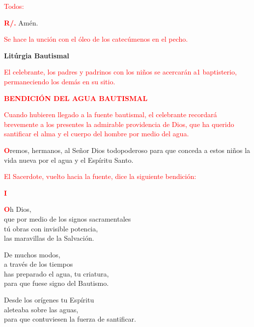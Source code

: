 \documentclass[12pt, letterpaper]{report}
\begin{document}
\large {\textcolor{red}{Todos:}}

\Large {\bfseries \textcolor{red}{R/.}} \hspace{0.5cm} Am\'en.

\large {\textcolor{red}{Se hace la unci\'on con el \'oleo de los catec\'umenos en el pecho.}}

\newpage

\begin{center}
\Huge {\bfseries Lit\'urgia Bautismal}
\end{center}

\large {\textcolor{red}{El celebrante, los padres y padrinos con los ni\~nos se acercar\'an a1 baptisterio, permaneciendo los dem\'as en su sitio.}} 

\Large {\bfseries \textcolor{red}{BENDICI\'ON DEL AGUA BAUTISMAL}} 

\large {\textcolor{red}{Cuando hubieren llegado a la fuente bautismal, el celebrante recordar\'a brevemente a los presentes la admirable providencia de Dios, que ha querido santificar el alma y el cuerpo del hombre por medio del agua.}} 

\lettrine[lines=1]{\bfseries \textcolor{red}{O}}{}\Large remos, hermanos, al Se\~nor Dios todopoderoso para que conceda a estos ni\~nos la vida nueva por el agua y el Esp\'iritu Santo.

\large {\textcolor{red}{El Sacerdote, vuelto hacia la fuente, dice la siguiente bendici\'on:}}

\begin{center}
\Large {\bfseries \textcolor{red}{I}} 
\end{center}

\lettrine[lines=1]{\bfseries \textcolor{red}{O}}{}\Large h Dios,\\ 
que por medio de los signos sacramentales\\ 
t\'u obras con invisible potencia,\\ 
las maravillas de la Salvaci\'on.

\noindent
De muchos modos,\\ 
a trav\'es de los tiempos\\ 
has preparado el agua, tu criatura,\\ 
para que fuese signo del Bautismo.

\noindent
Desde los or\'igenes tu Esp\'iritu\\ 
aleteaba sobre las aguas,\\ 
para que contuviesen la fuerza de santificar.
\end{document}
